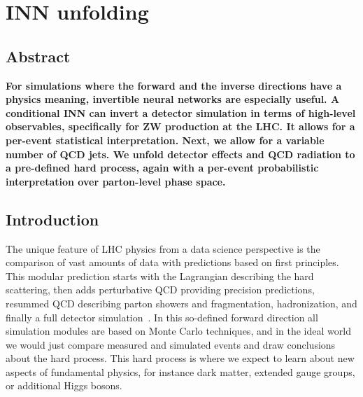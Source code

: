 %
%
%

\chapter{INN unfolding}\label{chap:inn}
\enlargethispage{2ex}
\vspace*{-2pt}

\enlargethispage{2ex}

\section*{Abstract}
{\bf For simulations where the forward and the inverse directions have a physics meaning, invertible neural networks are especially useful. A conditional INN can invert a detector simulation in terms of high-level observables, specifically for ZW production at the LHC. It allows for a per-event statistical interpretation. Next, we allow for a variable number of QCD jets. We unfold detector effects and QCD radiation to a pre-defined hard process, again with a per-event probabilistic interpretation over parton-level phase space.}

\newpage
\section{Introduction}
\label{sec:intro}

The unique feature of LHC physics from a data science perspective is
the comparison of vast amounts of data with predictions based on first
principles. This modular prediction starts with the Lagrangian
describing the hard scattering, then adds perturbative QCD providing
precision predictions, resummed QCD describing parton showers and
fragmentation, hadronization, and finally a full detector
simulation~\cite{black_book}. In this so-defined forward direction all
simulation modules are based on Monte Carlo techniques, and in the
ideal world we would just compare measured and simulated events and
draw conclusions about the hard process. This hard process is where we
expect to learn about new aspects of fundamental physics, for instance
dark matter, extended gauge groups, or additional Higgs bosons.

